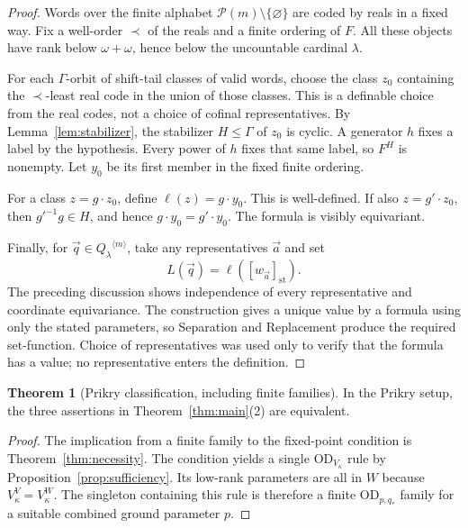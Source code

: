 \documentclass[11pt,letterpaper]{article}
\theoremstyle{definition}
\newtheorem{theorem}[definition]{Theorem}
\numberwithin{equation}{section}
\newcommand{\OD}{\mathrm{OD}}
\newcommand{\Pow}{\mathcal P}
\newcommand{\ttuple}[2]{{#1}^{\langle #2\rangle}}
\begin{document}
\begin{proof}
Words over the finite alphabet $\Pow(m)\setminus\{\varnothing\}$ are coded
by reals in a fixed way. Fix a well-order $\prec$ of the reals and a finite
ordering of $F$. All these objects have rank below $\omega+\omega$, hence
below the uncountable cardinal $\lambda$.

For each $\Gamma$-orbit of shift-tail classes of valid words, choose the
class $z_0$ containing the $\prec$-least real code in the union of those
classes. This is a definable choice from the real codes, not a choice of
cofinal representatives. By Lemma~\ref{lem:stabilizer}, the stabilizer
$H\le\Gamma$ of $z_0$ is cyclic. A generator $h$ fixes a label by the
hypothesis. Every power of $h$ fixes that same label, so $F^H$ is nonempty.
Let $y_0$ be its first member in the fixed finite ordering.

For a class $z=g\cdot z_0$, define $\ell(z)=g\cdot y_0$. This is
well-defined. If also $z=g'\cdot z_0$, then $g'^{-1}g\in H$, and hence
$g\cdot y_0=g'\cdot y_0$. The formula is visibly equivariant.

Finally, for $\vec q\in\ttuple{Q_\lambda}{m}$, take any representatives
$\vec a$ and set
\[
                          L(\vec q)=\ell([w_{\vec a}]_{\mathrm{st}}).
\]
The preceding discussion shows independence of every representative and
coordinate equivariance. The construction gives a unique value by a formula
using only the stated parameters, so Separation and Replacement produce the
required set-function. Choice of representatives was used only to verify
that the formula has a value; no representative enters the definition.
\end{proof}

\begin{theorem}[Prikry classification, including finite families]\label{thm:classification}
In the Prikry setup, the three assertions in Theorem~\ref{thm:main}(2) are
equivalent.
\end{theorem}

\begin{proof}
The implication from a finite family to the fixed-point condition is
Theorem~\ref{thm:necessity}. The condition yields a single $\OD_{V_\kappa}$
rule by Proposition~\ref{prop:sufficiency}. Its low-rank parameters are all
in $W$ because $V_\kappa^V=V_\kappa^W$. The singleton containing this rule
is therefore a finite $\OD_{p,q_*}$ family for a suitable combined ground
parameter $p$.
\end{proof}
\end{document}
